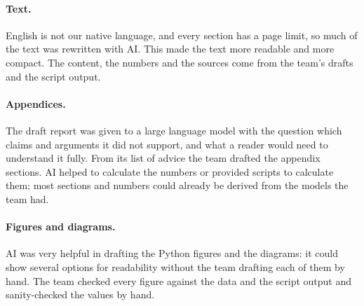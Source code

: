 \paragraph{Text.} English is not our native language, and every section has a
page limit, so much of the text was rewritten with AI. This made the text more
readable and more compact. The content, the numbers and the sources come from
the team's drafts and the script output.

\paragraph{Appendices.} The draft report was given to a large language model
with the question which claims and arguments it did not support, and what a
reader would need to understand it fully. From its list of advice the team
drafted the appendix sections. AI helped to calculate the numbers or provided
scripts to calculate them; most sections and numbers could already be derived
from the models the team had.

\paragraph{Figures and diagrams.} AI was very helpful in drafting the Python
figures and the diagrams: it could show several options for readability
without the team drafting each of them by hand. The team checked every figure
against the data and the script output and sanity-checked the values by hand.


